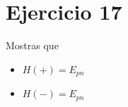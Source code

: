 \section*{Ejercicio 17}
Mostras que
\begin{itemize}
    \item $H(+)=E_{pn}$
    \item $H(-)=E_{pn}$
\end{itemize}